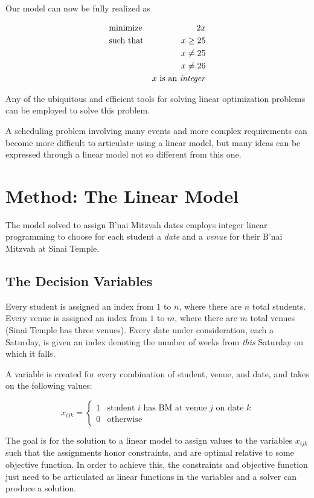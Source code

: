 \documentclass[11pt]{article}
\begin{document}
Our model can now be fully realized as

\begin{align*}
&\text{minimize} &2x\\
&\text{such that} & x \ge 25\\
&& x\ne 25\\
&& x\ne 26\\
&& x \text{ is an \emph{integer}}
\end{align*}

Any of the ubiquitous and efficient tools for solving linear optimization problems can be employed to solve this problem.

A scheduling problem involving many events and more complex requirements can become more difficult to articulate using a linear model, but many ideas can be expressed through a linear model not so different from this one.


\section{Method: The Linear Model}
The model solved to assign B'nai Mitzvah dates employs integer linear programming to choose for each student a \emph{date} and a \emph{venue} for their B'nai Mitzvah at Sinai Temple.

\subsection{The Decision Variables}


Every student is assigned an index from $1$ to $n$, where there are $n$ total students. Every venue is assigned an index from $1$ to $m$, where there are $m$ total venues (Sinai Temple has three venues). Every date under consideration, each a Saturday, is given an index denoting the number of weeks from \emph{this} Saturday on which it falls.

A variable is created for every combination of student, venue, and date, and takes on the following values:

\begin{equation}\label{x}
x_{ijk}=
\begin{cases}
      1 & \text{student $i$ has BM at venue $j$ on date $k$} \\
      0 & \text{otherwise}
   \end{cases}
\end{equation}

The goal is for the solution to a linear model to assign values to the variables $x_{ijk}$ such that the assignments honor constraints, and are optimal relative to some objective function. In order to achieve this, the constraints and objective function just need to be articulated as linear functions in the variables and a solver can produce a solution.
\end{document}

